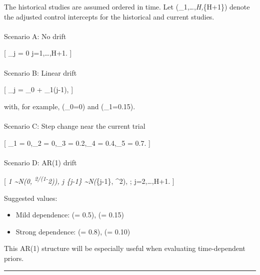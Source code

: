 \documentclass[
  letterpaper,
  DIV=11,
  numbers=noendperiod]{scrartcl}
\makeatletter
\let\oldparagraph\paragraph
\renewcommand{\paragraph}{
    \@ifstar
      \xxxParagraphStar
      \xxxParagraphNoStar
  }
\newcommand{\xxxParagraphStar}[1]{\oldparagraph*{#1}\mbox{}}
\newcommand{\xxxParagraphNoStar}[1]{\oldparagraph{#1}\mbox{}}
\providecommand{\tightlist}{%
  \setlength{\itemsep}{0pt}\setlength{\parskip}{0pt}}
\makeatother
\begin{document}
The historical studies are assumed ordered in time. Let
(\alpha\_1,\dots,\alpha\emph{H,\alpha}\{H+1\}) denote the adjusted
control intercepts for the historical and current studies.

\paragraph{Scenario A: No drift}\label{scenario-a-no-drift}

{[} \alpha\_j = 0 \quad {} j=1,\dots,H+1. {]}

\paragraph{Scenario B: Linear drift}\label{scenario-b-linear-drift}

{[} \alpha\_j = \delta\_0 + \delta\_1(j-1), {]}

with, for example, (\delta\_0=0) and (\delta\_1=0.15).

\paragraph{Scenario C: Step change near the current
trial}\label{scenario-c-step-change-near-the-current-trial}

{[} \alpha\_1 = 0,\quad \alpha\_2 = 0,\quad \alpha\_3 =
0.2,\quad \alpha\_4 = 0.4,\quad \alpha\_5 = 0.7. {]}

\paragraph{Scenario D: AR(1) drift}\label{scenario-d-ar1-drift}

{[} \alpha\emph{1 \sim N(0, \omega\textsuperscript{2/(1-\phi}2)), \qquad
\alpha\emph{j \mid \alpha}\{j-1\} \sim N(\phi \alpha}\{j-1\},
\omega\^{}2), ; j=2,\dots,H+1. {]}

Suggested values:

\begin{itemize}
\tightlist
\item
  Mild dependence: (\phi = 0.5), (\omega = 0.15)
\item
  Strong dependence: (\phi = 0.8), (\omega = 0.10)
\end{itemize}

This AR(1) structure will be especially useful when evaluating
time-dependent priors.

\begin{center}\rule{0.5\linewidth}{0.5pt}\end{center}
\end{document}
